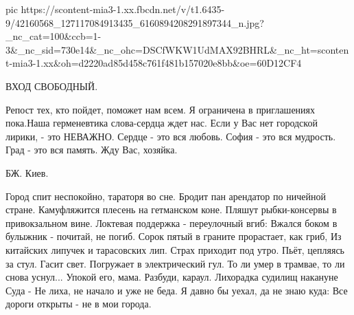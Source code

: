 \ifcmt
  pic https://scontent-mia3-1.xx.fbcdn.net/v/t1.6435-9/42160568_127117084913435_6160894208291897344_n.jpg?_nc_cat=100&ccb=1-3&_nc_sid=730e14&_nc_ohc=DSCfWKW1UdMAX92BHRL&_nc_ht=scontent-mia3-1.xx&oh=d2220ad85d458c761f481b157020e8bb&oe=60D12CF4
\fi

ВХОД СВОБОДНЫЙ. 

Репост тех, кто пойдет, поможет нам всем. Я ограничена в приглашениях пока.Наша
герменевтика слова-сердца ждет нас. Если у Вас нет городской лирики, - это
НЕВАЖНО. Сердце - это вся любовь. София - это вся мудрость. Град - это вся
память. Жду Вас, хозяйка.

БЖ. Киев.

Город спит неспокойно, тараторя во сне.
Бродит пан арендатор по ничейной стране.
Камуфляжится плесень на гетманском коне.
Пляшут рыбки-консервы в привокзальном вине.
Локтевая поддержка - переулочный вгиб:
Вжался боком в булыжник - почитай, не погиб.
Сорок пятый в граните прорастает, как гриб,
Из китайских липучек и тарасовских лип.
Страх приходит под утро. Пьёт, цепляясь за стул.
Гасит свет. Погружает в электрический гул.
То ли умер в трамвае, то ли снова уснул...
Упокой его, мама. Разбуди, караул.
Лихорадка судилищ накануне Суда -
Не лиха, не начало и уже не беда.
Я давно бы уехал, да не знаю куда: 
Все дороги открыты - не в мои города.
